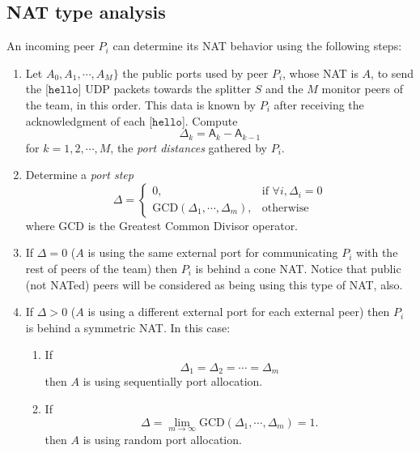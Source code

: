 \subsection{NAT type analysis}
An incoming peer $P_i$ can determine its NAT behavior using the
following steps:
\begin{enumerate}
\item Let $A_0, A_1, \cdots, A_M\}$ the public ports used by peer
  $P_i$, whose NAT is $A$, to send the [$\mathtt{hello}$] UDP packets
  towards the splitter $S$ and the $M$ monitor peers of the team, in
  this order. This data is known by $P_i$ after receiving the
  acknowledgment of each [$\mathtt{hello}$]. Compute
  \begin{equation}
    \Delta_k = \mathsf{A}_k - \mathsf{A}_{k-1}
    \label{eq:port_distancies}
  \end{equation}
  for $k=1,2,\cdots,M$, the \emph{port distances} gathered by $P_i$.
\item Determine a \emph{port step}
  \begin{equation}
    \Delta = \left\{\begin{array}{lr}
    0, & \text{if } \forall i, \Delta_i = 0 \\
    \mathrm{GCD}(\Delta_1, \cdots, \Delta_m), & \text{otherwise}
    \end{array}\right.
    \label{eq:port_step}
  \end{equation}
  where GCD is the Greatest Common Divisor operator.
\item If $\Delta=0$ ($A$ is using the same external port for
  communicating $P_i$ with the rest of peers of the team) then $P_i$
  is behind a cone NAT. Notice that public (not NATed) peers will be
  considered as being using this type of NAT, also.
\item If $\Delta>0$ ($A$ is using a different external port for each
  external peer) then $P_i$ is behind a symmetric NAT. In this case:
  \begin{enumerate}
  \item If
    \begin{equation}
      \Delta_1 = \Delta_2 = \cdots = \Delta_m
    \end{equation}
    then $A$ is using sequentially port allocation.
  \item If
    \begin{equation}
      \Delta = \lim_{m\to\infty} \mathrm{GCD}(\Delta_1, \cdots, \Delta_m) = 1.
    \end{equation}
    then $A$ is using random port allocation.
  \end{enumerate}
\end{enumerate}

